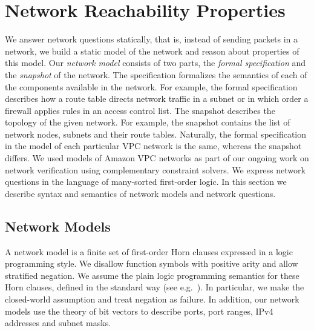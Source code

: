 
\section{Network Reachability Properties}
\label{sect:aws/specification}
We answer network questions statically, that is, instead of sending packets in a network, we build a static model of the network and reason about properties of this model. Our \emph{network model} consists of two parts, the \emph{formal specification} and the \emph{snapshot} of the network. The specification formalizes the semantics of each of the components available in the network. For example, the formal specification describes how a route table directs network traffic in a subnet or in which order a firewall applies rules in an access control list. The snapshot describes the topology of the given network. For example, the snapshot contains the list of network nodes, subnets and their route tables. Naturally, the formal specification in the model of each particular VPC network is the same, whereas the snapshot differs. We used models of Amazon VPC networks as part of our ongoing work on network verification using complementary constraint solvers. We express network questions in the language of many-sorted first-order logic. In this section we describe syntax and semantics of network models and network questions.

\subsection{Network Models}
\label{sect:aws/reachability/spec}
A network model is a finite set of first-order Horn clauses expressed in a logic programming style. We disallow function symbols with positive arity and allow stratified negation. We assume the plain logic programming semantics for these Horn clauses, defined in the standard way (see e.g.~\cite{DBLP:books/sp/Lloyd87}). In particular, we make the closed-world assumption and treat negation as failure. In addition, our network models use the theory of bit vectors to describe ports, port ranges, IPv4 addresses and subnet masks.

